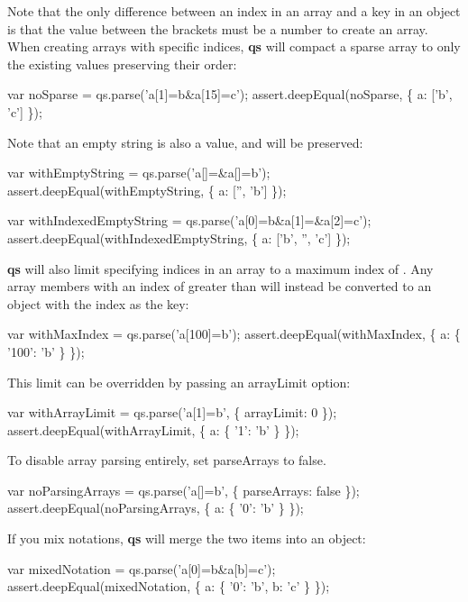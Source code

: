 Note that the only difference between an index in an array and a key in an object is that the value between the brackets must be a number to create an array. When creating arrays with specific indices, {\bfseries qs} will compact a sparse array to only the existing values preserving their order\+:


\begin{DoxyCode}
var noSparse = qs.parse('a[1]=b&a[15]=c');
assert.deepEqual(noSparse, \{ a: ['b', 'c'] \});
\end{DoxyCode}


Note that an empty string is also a value, and will be preserved\+:


\begin{DoxyCode}
var withEmptyString = qs.parse('a[]=&a[]=b');
assert.deepEqual(withEmptyString, \{ a: ['', 'b'] \});

var withIndexedEmptyString = qs.parse('a[0]=b&a[1]=&a[2]=c');
assert.deepEqual(withIndexedEmptyString, \{ a: ['b', '', 'c'] \});
\end{DoxyCode}


{\bfseries qs} will also limit specifying indices in an array to a maximum index of {}. Any array members with an index of greater than {} will instead be converted to an object with the index as the key\+:


\begin{DoxyCode}
var withMaxIndex = qs.parse('a[100]=b');
assert.deepEqual(withMaxIndex, \{ a: \{ '100': 'b' \} \});
\end{DoxyCode}


This limit can be overridden by passing an {\ttfamily array\+Limit} option\+:


\begin{DoxyCode}
var withArrayLimit = qs.parse('a[1]=b', \{ arrayLimit: 0 \});
assert.deepEqual(withArrayLimit, \{ a: \{ '1': 'b' \} \});
\end{DoxyCode}


To disable array parsing entirely, set {\ttfamily parse\+Arrays} to {\ttfamily false}.


\begin{DoxyCode}
var noParsingArrays = qs.parse('a[]=b', \{ parseArrays: false \});
assert.deepEqual(noParsingArrays, \{ a: \{ '0': 'b' \} \});
\end{DoxyCode}


If you mix notations, {\bfseries qs} will merge the two items into an object\+:


\begin{DoxyCode}
var mixedNotation = qs.parse('a[0]=b&a[b]=c');
assert.deepEqual(mixedNotation, \{ a: \{ '0': 'b', b: 'c' \} \});
\end{DoxyCode}


